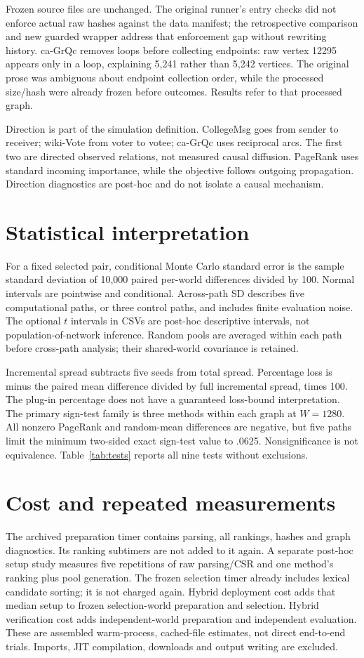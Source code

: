 \documentclass[smallextended]{svjour3}
\begin{document}
Frozen source files are unchanged. The original runner's entry checks did not
enforce actual raw hashes against the data manifest; the retrospective comparison
and new guarded wrapper address that enforcement gap without rewriting history.
ca-GrQc removes loops before collecting endpoints: raw vertex 12295 appears only
in a loop, explaining 5,241 rather than 5,242 vertices. The original prose was
ambiguous about endpoint collection order, while the processed size/hash were
already frozen before outcomes. Results refer to that processed graph.

Direction is part of the simulation definition. CollegeMsg goes from sender to
receiver; wiki-Vote from voter to votee; ca-GrQc uses reciprocal arcs. The first
two are directed observed relations, not measured causal diffusion. PageRank uses
standard incoming importance, while the objective follows outgoing propagation.
Direction diagnostics are post-hoc and do not isolate a causal mechanism.

\section{Statistical interpretation}
For a fixed selected pair, conditional Monte Carlo standard error is the sample
standard deviation of 10,000 paired per-world differences divided by 100.
Normal intervals are pointwise and conditional. Across-path SD describes five
computational paths, or three control paths, and includes finite evaluation noise.
The optional $t$ intervals in CSVs are post-hoc descriptive intervals, not
population-of-network inference. Random pools are averaged within each path
before cross-path analysis; their shared-world covariance is retained.

Incremental spread subtracts five seeds from total spread. Percentage loss is
minus the paired mean difference divided by full incremental spread, times 100.
The plug-in percentage does not have a guaranteed loss-bound interpretation.
The primary sign-test family is three methods within each graph at $W=1280$.
All nonzero PageRank and random-mean differences are negative, but five paths
limit the minimum two-sided exact sign-test value to .0625. Nonsignificance is
not equivalence. Table~\ref{tab:tests} reports all nine tests without exclusions.

\section{Cost and repeated measurements}
The archived preparation timer contains parsing, all rankings, hashes and graph
diagnostics. Its ranking subtimers are not added to it again. A separate
post-hoc setup study measures five repetitions of raw parsing/CSR and one
method's ranking plus pool generation. The frozen selection timer already includes
lexical candidate sorting; it is not charged again. Hybrid deployment cost adds that
median setup to frozen selection-world preparation and selection. Hybrid
verification cost adds independent-world preparation and independent evaluation.
These are assembled warm-process, cached-file estimates, not direct end-to-end
trials. Imports, JIT compilation, downloads and output writing are excluded.
\end{document}
